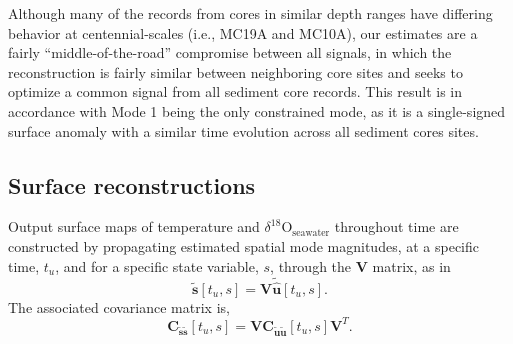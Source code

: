 \documentclass[draft]{agujournal2019}
\begin{document}
Although many of the records from cores in similar depth
ranges have
differing behavior at centennial-scales
(i.e., MC19A and MC10A), our
estimates are a fairly ``middle-of-the-road'' compromise between all
signals, in which the reconstruction is fairly similar between
neighboring core sites and seeks to optimize a common signal from all
sediment core records. This result is in accordance with Mode 1 being
the only constrained mode, as it is a single-signed surface anomaly
with a similar time evolution across all sediment cores sites.

\subsection{Surface reconstructions \label{sec:surfrecon}}
Output surface maps of temperature and $\delta^{18}\mathrm{O}_{\mathrm{seawater}}$ throughout time are constructed by propagating estimated spatial mode magnitudes, at a specific time, $t_u$, and for a specific state variable, $s$, through the $\mathbf{V}$ matrix, as in
\begin{equation}
\label{eq:surfrecon}
  \mathbf{\tilde{s}}[t_u, s] = \mathbf{V \tilde{\hat{u}}}[t_u, s]. 
\end{equation}
The associated covariance matrix is,
\begin{equation}
\label{eq:surfreconunc}
\mathbf{C_{\tilde{s}\tilde{s}}}[t_u, s] = \mathbf{V C_{\tilde{u}\tilde{u}}}[t_u, s]\mathbf{V}^T.
\end{equation}
\end{document}

